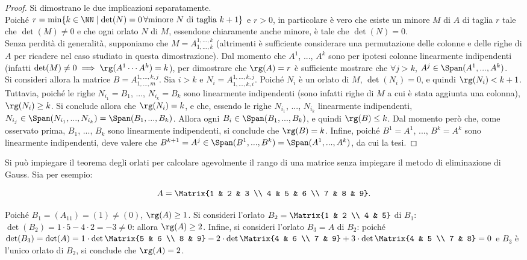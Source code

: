 \documentclass[11pt]{article}
\begin{document}
	\begin{proof} Si dimostrano le due implicazioni separatamente. \\
		
		\rightproof Poiché $r = \min\{ k \in \NN \mid \det(N) = 0 \, \forall \text{minore } N \text{ di taglia } k+1 \}$ e $r>0$, in
		particolare è vero che esiste un minore $M$ di $A$ di taglia $r$ tale che $\det(M) \neq 0$ e che ogni orlato $N$
		di $M$, essendone chiaramente anche minore, è tale che $\det(N) = 0$. \\
		
		\leftproof Senza perdità di generalità, supponiamo che $M = A^{1, ..., k}_{1, ..., k}$ (altrimenti è sufficiente
		considerare una permutazione delle colonne e delle righe di $A$ per ricadere nel caso studiato in questa dimostrazione). Dal momento che $A^1$, ..., $A^k$ sono per ipotesi colonne linearmente indipendenti (infatti
		$\det(M) \neq 0 \implies \rg(A^1 \cdots A^k) = k$), per dimostrare che $\rg(A) = r$ è sufficiente mostrare che
		$\forall j > k$, $A^j \in \Span(A^1, ..., A^k)$. \\
		
		Si consideri allora la matrice $B = A^{1, ..., k, j}_{1, ..., m}$. Sia $i > k$ e $N_i = A^{1, ..., k, j}_{1, ..., k, i}$. Poiché $N_i$ è un orlato di $M$, $\det(N_i) = 0$, e quindi $\rg(N_i) < k+1$. Tuttavia, poiché le righe $N_{i_1} = B_1$, ..., $N_{i_k} = B_k$ sono linearmente
		indipendenti (sono infatti righe di $M$ a cui è stata aggiunta una colonna), $\rg(N_i) \geq k$. Si conclude
		allora che $\rg(N_i) = k$, e che, essendo le righe $N_{i_1}$, ..., $N_{i_k}$ linearmente indipendenti,
		$N_{i_j} \in \Span(N_{i_1}, ..., N_{i_k}) = \Span(B_1, ..., B_k)$. Allora ogni $B_i \in \Span(B_1, ..., B_k)$,
		e quindi $\rg(B) \leq k$. Dal momento però che, come osservato prima, $B_1$, ..., $B_k$ sono linearmente
		indipendenti, si conclude che $\rg(B) = k$. Infine, poiché $B^1 = A^1$, ..., $B^k = A^k$ sono linearmente
		indipendenti, deve valere che $B^{k+1} = A^j \in \Span(B^1, ..., B^k) = \Span(A^1, ..., A^k)$, da cui la tesi.
	\end{proof}

	\begin{example}
		Si può impiegare il teorema degli orlati per calcolare agevolmente il rango di una matrice senza impiegare
		il metodo di eliminazione di Gauss. Sia per esempio:
		
		\[ A = \Matrix{1 & 2 & 3 \\ 4 & 5 & 6 \\ 7 & 8 & 9}. \]
		
		Poiché $B_1 = (A_{11}) = (1) \neq (0)$, $\rg(A) \geq 1$. Si consideri l'orlato $B_2 = \Matrix{1 & 2 \\ 4 & 5}$ di $B_1$:
		$\det(B_2) = 1\cdot 5 - 4 \cdot 2 = -3 \neq 0$: allora $\rg(A) \geq 2$. Infine, si consideri l'orlato $B_3 = A$ di
		$B_2$: poiché $\det(B_3) = \det(A) = 1\cdot \det\Matrix{5 & 6 \\ 8 & 9} - 2 \cdot \det\Matrix{4 & 6 \\ 7 & 9} + 3  \cdot \det\Matrix{4 & 5 \\ 7 & 8}  = 0$ e $B_3$ è l'unico orlato di $B_2$, si conclude che $\rg(A) = 2$.
	\end{example}
\end{document}
